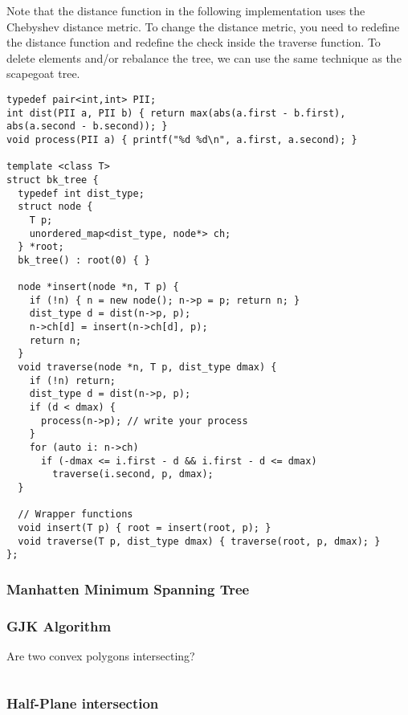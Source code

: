 Note that the distance function in the following implementation uses the Chebyshev distance metric.
To change the distance metric, you need to redefine the distance function and redefine the check
inside the traverse function. To delete elements and/or rebalance the tree,
we can use the same technique as the scapegoat tree.

\begin{lstlisting}
typedef pair<int,int> PII;
int dist(PII a, PII b) { return max(abs(a.first - b.first), abs(a.second - b.second)); }
void process(PII a) { printf("%d %d\n", a.first, a.second); }

template <class T>
struct bk_tree {
  typedef int dist_type;
  struct node {
    T p;
    unordered_map<dist_type, node*> ch;
  } *root;
  bk_tree() : root(0) { }

  node *insert(node *n, T p) {
    if (!n) { n = new node(); n->p = p; return n; }
    dist_type d = dist(n->p, p);
    n->ch[d] = insert(n->ch[d], p);
    return n;
  }
  void traverse(node *n, T p, dist_type dmax) {
    if (!n) return;
    dist_type d = dist(n->p, p);
    if (d < dmax) {
      process(n->p); // write your process
    }
    for (auto i: n->ch) 
      if (-dmax <= i.first - d && i.first - d <= dmax) 
        traverse(i.second, p, dmax);
  }

  // Wrapper functions
  void insert(T p) { root = insert(root, p); }
  void traverse(T p, dist_type dmax) { traverse(root, p, dmax); }
};
\end{lstlisting}

\newpage

\subsubsection{Manhatten Minimum Spanning Tree}
\subsubsection{GJK Algorithm}

Are two convex polygons intersecting?

\hrulefill \vspace{-\baselineskip}
\begin{multicols}{2}
\inputminted[autogobble,fontsize=\tiny]{C++}{Geometry/gjk.cpp}
\end{multicols}
\vspace{-\baselineskip}
\noindent \hrulefill

\subsubsection{Half-Plane intersection}


